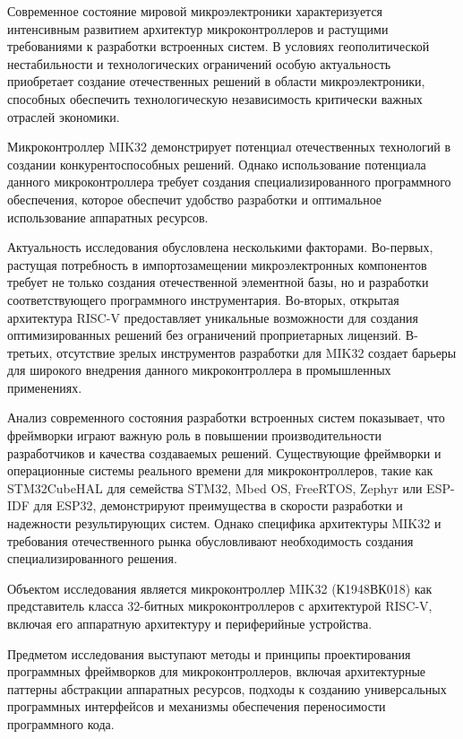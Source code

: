\Introduction

Современное состояние мировой микроэлектроники характеризуется интенсивным развитием архитектур микроконтроллеров и растущими требованиями к разработки встроенных систем. В условиях геополитической нестабильности и технологических ограничений особую актуальность приобретает создание отечественных решений в области микроэлектроники, способных обеспечить технологическую независимость критически важных отраслей экономики.

Микроконтроллер MIK32 демонстрирует потенциал отечественных технологий в создании конкурентоспособных решений. Однако использование потенциала данного микроконтроллера требует создания специализированного программного обеспечения, которое обеспечит удобство разработки и оптимальное использование аппаратных ресурсов.

Актуальность исследования обусловлена несколькими факторами. Во-первых, растущая потребность в импортозамещении микроэлектронных компонентов требует не только создания отечественной элементной базы, но и разработки соответствующего программного инструментария. Во-вторых, открытая архитектура RISC-V предоставляет уникальные возможности для создания оптимизированных решений без ограничений проприетарных лицензий. В-третьих, отсутствие зрелых инструментов разработки для MIK32 создает барьеры для широкого внедрения данного микроконтроллера в промышленных применениях.

Анализ современного состояния разработки встроенных систем показывает, что фреймворки играют важную роль в повышении производительности разработчиков и качества создаваемых решений. Существующие фреймворки и операционные системы реального времени для микроконтроллеров, такие как STM32CubeHAL для семейства STM32, Mbed OS, FreeRTOS, Zephyr или ESP-IDF для ESP32, демонстрируют преимущества в скорости разработки и надежности результирующих систем. Однако специфика архитектуры MIK32 и требования отечественного рынка обусловливают необходимость создания специализированного решения.

Объектом исследования является микроконтроллер MIK32 (К1948ВК018) как представитель класса 32-битных микроконтроллеров с архитектурой RISC-V, включая его аппаратную архитектуру и периферийные устройства.

Предметом исследования выступают методы и принципы проектирования программных фреймворков для микроконтроллеров, включая архитектурные паттерны абстракции аппаратных ресурсов, подходы к созданию универсальных программных интерфейсов и механизмы обеспечения переносимости программного кода.

